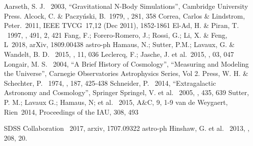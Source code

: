 \documentclass[preprint]{aastex62}
\begin{document}
  \begin{thebibliography}{}
     Aarseth, S. J. \ 2003, ``Gravitational N-Body Simulations'', Cambridge University Press.
     Alcock, C. \& Paczy\'nski, B.\ 1979, \nat, 281, 358    
     Correa, Carlos \& Lindstrom, Peter.\ 2011,  IEEE TVCG\ 17,12 (Dec 2011), 1852-1861
     El-Ad, H. \& Piran, T. \ 1997, \apj, 491, 2, 421
     Fang, F.; Forero-Romero, J.; Rossi, G.; Li, X. \& Feng, L\ 2018, arXiv, 1809.00438 astro-ph
     Hamaus, N.; Sutter, P.M.; Lavaux, G. \& Wandelt, B. D. \ 2015, \jcap, 11, 036    
     Leclercq, F.; Jasche, J. et al.\ 2015, \jcap, 03, 047
     Longair, M. S. \ 2004, ``A Brief History of Cosmology'', ``Measuring and Modeling the Universe'', Carnegie Observatories Astrophysics Series, Vol 2.
     Press, W. H. \& Schechter, P. \ 1974, \apj, 187, 425-438
     Schneider, P. \ 2014, ``Extragalactic Astronomy and Cosmology'', Springer
     Springel, V. et al. \ 2005, \nat, 435, 639
     Sutter, P. M.; Lavaux G.; Hamaus, N; et al. \ 2015, A\&C, 9, 1-9
     van de Weygaert, Rien\ 2014, Proceedings of the IAU, 308, 493      

     SDSS Collaboration \ 2017, arxiv, 1707.09322 astro-ph
     Hinshaw, G. et al. \ 2013, \apjs, 208, 20.
  \end{thebibliography}                                                           
                       

\end{document}
